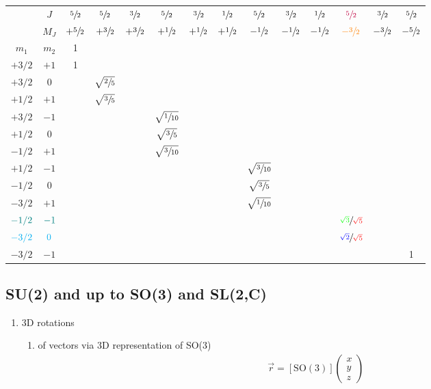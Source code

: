 \documentclass[../main.tex]{subfiles}
\begin{document}
\begin{itemize}
\begin{table}[!h]
\centering
\tiny
\begin{tabular}{cc||c|cc|ccc|ccc|cc|c}
& $J$  & $\sfrac{5}{2}$ & $\sfrac{5}{2}$ & $\sfrac{3}{2}$ & $\sfrac{5}{2}$ & $\sfrac{3}{2}$& $\sfrac{1}{2}$ & $\sfrac{5}{2}$ & $\sfrac{3}{2}$& $\sfrac{1}{2}$ & $\textcolor{purple}{\sfrac{5}{2}}$ & $\sfrac{3}{2}$ & $\sfrac{5}{2}$\\
& $M_J$& $+\sfrac{5}{2}$ & $+\sfrac{3}{2}$ & $+\sfrac{3}{2}$ & $+\sfrac{1}{2}$ & $+\sfrac{1}{2}$ & $+\sfrac{1}{2}$ & $-\sfrac{1}{2}$ & $-\sfrac{1}{2}$ & $-\sfrac{1}{2}$ & $\textcolor{orange}{-\sfrac{3}{2}}$ & $-\sfrac{3}{2}$ & $-\sfrac{5}{2}$ \\ \hline
$m_1$ & $m_2$ &1&&&&&&&&&&&\\  \hline\hline
$+3/2$ & $+1$ &1&&&&&&&&&&&\\ \hline

$+3/2$ & $0$  &&$\sqrt{\sfrac{2}{5}}$&&&&&&&&&&\\
$+1/2$ & $+1$ &&$\sqrt{\sfrac{3}{5}}$&&&&&&&&&&\\ \hline

$+3/2$ & $-1$ &&&&$\sqrt{\sfrac{1}{10}}$&&&&&&&&\\
$+1/2$ & $0$  &&&&$\sqrt{\sfrac{3}{5}}$&&&&&&&&\\
$-1/2$ & $+1$ &&&&$\sqrt{\sfrac{3}{10}}$&&&&&&&&\\ \hline

$+1/2$ & $-1$ &&&&&&&$\sqrt{\sfrac{3}{10}}$&&&&&\\
$-1/2$ & $0$  &&&&&&&$\sqrt{\sfrac{3}{5}}$&&&&&\\
$-3/2$ & $+1$ &&&&&&&$\sqrt{\sfrac{1}{10}}$&&&&&\\ \hline

$\textcolor{teal}{-1/2}$ & $\textcolor{teal}{-1}$ &&&&&&&&&&$\sfrac{\textcolor{green}{\sqrt{3}}}{\textcolor{red}{\sqrt{5}}}$&&\\
$\textcolor{cyan}{-3/2}$ & $\textcolor{cyan}{0}$  &&&&&&&&&&$\sfrac{\textcolor{blue}{\sqrt{2}}}{\textcolor{red}{\sqrt{5}}}$&&\\ \hline

$-3/2$ & $-1$ &&&&&&&&&&&&1\\
\end{tabular}
\end{table}

\subsection{SU(2) and up to SO(3) and SL(2,C)}
\begin{enumerate}
\item 3D rotations
\begin{enumerate}
\item of vectors via 3D representation of SO(3)
\begin{align}
[\text{SO}(3)]\vec{r}=[\text{SO}(3)]
\left(\begin{matrix}
x\\y\\z
\end{matrix}\right)
\end{align}


\end{enumerate}
\end{enumerate}
\end{itemize}
\end{document}

